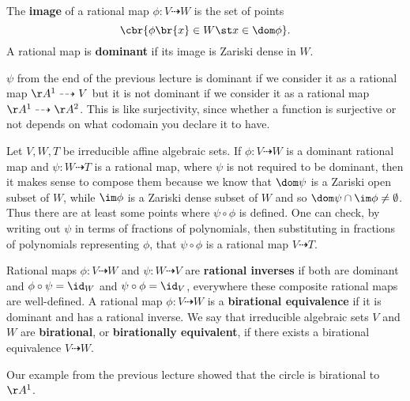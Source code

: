 \begin{definition*}
The \textbf{image} of a rational map $ \phi : V \dashrightarrow W $ is the set of points
$$ \cbr{\phi\br{x} \in W \st x \in \dom \phi}. $$
A rational map is \textbf{dominant} if its image is Zariski dense in $ W $.
\end{definition*}

\begin{example*}
$ \psi $ from the end of the previous lecture is dominant if we consider it as a rational map $ \AA^1 \dashrightarrow V $ but it is not dominant if we consider it as a rational map $ \AA^1 \dashrightarrow \AA^2 $. This is like surjectivity, since whether a function is surjective or not depends on what codomain you declare it to have.
\end{example*}

Let $ V, W, T $ be irreducible affine algebraic sets. If $ \phi : V \dashrightarrow W $ is a dominant rational map and $ \psi : W \dashrightarrow T $ is a rational map, where $ \psi $ is not required to be dominant, then it makes sense to compose them because we know that $ \dom \psi $ is a Zariski open subset of $ W $, while $ \im \phi $ is a Zariski dense subset of $ W $ and so $ \dom \psi \cap \im \phi \ne \emptyset $. Thus there are at least some points where $ \psi \circ \phi $ is defined. One can check, by writing out $ \psi $ in terms of fractions of polynomials, then substituting in fractions of polynomials representing $ \phi $, that $ \psi \circ \phi $ is a rational map $ V \dashrightarrow T $.

\begin{definition*}
Rational maps $ \phi : V \dashrightarrow W $ and $ \psi : W \dashrightarrow V $ are \textbf{rational inverses} if both are dominant and $ \phi \circ \psi = \id_W $ and $ \psi \circ \phi = \id_V $, everywhere these composite rational maps are well-defined. A rational map $ \phi : V \dashrightarrow W $ is a \textbf{birational equivalence} if it is dominant and has a rational inverse. We say that irreducible algebraic sets $ V $ and $ W $ are \textbf{birational}, or \textbf{birationally equivalent}, if there exists a birational equivalence $ V \dashrightarrow W $.
\end{definition*}

\pagebreak

\begin{example*}
Our example from the previous lecture showed that the circle is birational to $ \AA^1 $.
\end{example*}


